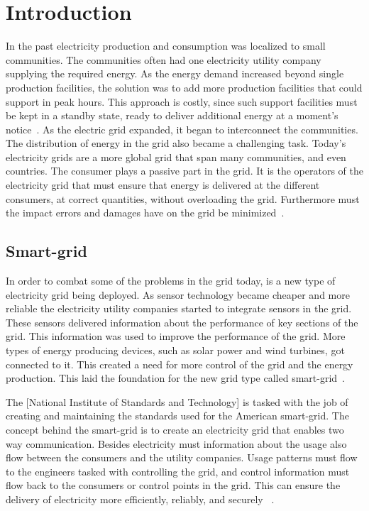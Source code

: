 \chapter{Introduction}
In the past electricity production and consumption was localized to small communities. The communities often had one electricity utility company supplying the required energy. As the energy demand increased beyond single production facilities, the solution was to add more production facilities that could support in peak hours. This approach is costly, since such support facilities must be kept in a standby state, ready to deliver additional energy at a moment’s notice~\citep{RefWorks:46}. As the electric grid expanded, it began to interconnect the communities. The distribution of energy in the grid also became a challenging task. Today's electricity grids are a more global grid that span many communities, and even countries. The consumer plays a passive part in the grid. It is the operators of the electricity grid that must ensure that energy is delivered at the different consumers, at correct quantities, without overloading the grid. Furthermore must the impact errors and damages have on the grid be minimized~\citep{RefWorks:43}.

\section{Smart-grid}
In order to combat some of the problems in the grid today, is a new type of electricity grid being deployed. As sensor technology became cheaper and more reliable the electricity utility companies started to integrate sensors in the grid. These sensors delivered information about the performance of key sections of the grid. This information was used to improve the performance of the grid. More types of energy producing devices, such as solar power and wind turbines, got connected to it. This created a need for more control of the grid and the energy production. This laid the foundation for the new grid type called smart-grid~\citep{RefWorks:43}.

The [National Institute of Standards and Technology] is tasked with the job of creating and maintaining the standards used for the American smart-grid. The concept behind the smart-grid is to create an electricity grid that enables two way communication. Besides electricity must information about the usage also flow between the consumers and the utility companies. Usage patterns must flow to the engineers tasked with controlling the grid, and control information must flow back to the consumers or control points in the grid. This can ensure the delivery of electricity more efficiently, reliably, and securely ~\citep{RefWorks:42}. 

